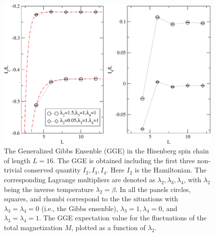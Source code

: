 \documentclass[twocolumn,superscriptaddress,prb,10pt]{revtex4-1}
\begin{document}
\begin{figure}[t]
\includegraphics*[width=0.93\linewidth]{./draft_figs/finite_size}
\caption{The Generalized Gibbs Ensenble (GGE) in the Hisenberg spin chain of 
 length $L=16$. The GGE is obtained including the first three non-trivial 
 conserved quantity $I_2, I_3,I_4$. Here $I_2$ is the Hamiltonian. The corresponding 
 Lagrange multipliers are denoted as $\lambda_2,\lambda_3,\lambda_4$, with $\lambda_2$ 
 being the inverse temperature $\lambda_2=\beta$. In all the panels circles, squares, 
 and rhombi correspond to the the situations with $\lambda_3=\lambda_4=0$ 
 (i.e., the Gibbs ensenble), $\lambda_3=1,\lambda_4=0$, and $\lambda_3=\lambda_4=1$.
 The GGE expectation value for the fluctuations of the total magnetization $M$, plotted 
 as a function of $\lambda_2$.
}
\label{finite-size}
\end{figure}


\begin{thebibliography}{99}


\end{thebibliography}
\end{document}

